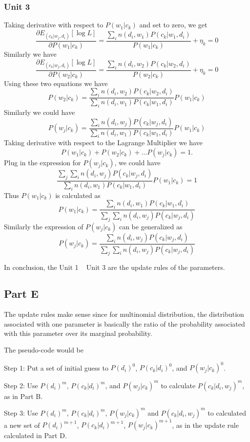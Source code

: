\subsubsection{Unit 3}
Taking derivative with respect to $P(w_1|c_k)$ and set to zero, we get
\[\dfrac{\partial E_{(c_k|w_j,d_i)}[\log{L}]}{\partial P(w_1|c_k)}=\dfrac{\sum\limits_{i}n(d_i,w_1)P(c_k|w_1,d_i)}{P(w_1|c_k)} +\eta_k=0\]
Similarly we have 
\[\dfrac{\partial E_{(c_k|w_j,d_i)}[\log{L}]}{\partial P(w_2|c_k)}=\dfrac{\sum\limits_{i}n(d_i,w_2)P(c_k|w_2,d_i)}{P(w_2|c_k)} +\eta_k=0\]
Using these two equations we have 
\[P(w_2|c_k)=\dfrac{\sum\limits_{i}n(d_i,w_2)P(c_k|w_2,d_i)}{\sum\limits_{i}n(d_i,w_1)P(c_k|w_1,d_i)}P(w_1|c_k)\]
Similarly we could have 
\[P(w_j|c_k)=\dfrac{\sum\limits_{i}n(d_i,w_j)P(c_k|w_j,d_i)}{\sum\limits_{i}n(d_i,w_1)P(c_k|w_1,d_i)}P(w_1|c_k)\]
Taking derivative with respect to the Lagrange Multiplier we have
\[P(w_1|c_k)+P(w_2|c_k)+\ldots P(w_j|c_k)=1.\]
Plug in the expression for $P(w_j|c_k)$, we could have
\[\dfrac{\sum\limits_{j}\sum\limits_{i}n(d_i,w_j)P(c_k|w_j,d_i)}{\sum\limits_{i}n(d_i,w_1)P(c_k|w_1,d_i)}P(w_1|c_k)=1\]
Thus $P(w_1|c_k)$ is calculated as 
\[P(w_1|c_k)=\dfrac{\sum\limits_{i}n(d_i,w_1)P(c_k|w_1,d_i)}{\sum\limits_{j}\sum\limits_{i}n(d_i,w_j)P(c_k|w_j,d_i)}\]
Similarly the expression of $P(w_j|c_k)$ can be generalized as 
\[P(w_j|c_k)=\dfrac{\sum\limits_{i}n(d_i,w_j)P(c_k|w_j,d_i)}{\sum\limits_{j}\sum\limits_{i}n(d_i,w_j)P(c_k|w_j,d_i)}\]

\noindent In conclusion, the Unit 1 ~ Unit 3 are the update rules of the parameters. 

\subsection{Part E}
The update rules make sense since for multinomial distribution, the distribution associated with one parameter is basically the ratio of the probability associated with this parameter over its marginal probability. 

\noindent The pseudo-code would be 

\noindent Step 1: Put a set of initial guess to ${P(d_i)}^0$, ${P(c_k|d_i)}^0$, and ${P(w_j|c_k)}^0$.

\noindent Step 2: Use ${P(d_i)}^m$, ${P(c_k|d_i)}^m$, and ${P(w_j|c_k)}^m$ to calculate ${P(c_k|d_i,w_j)}^m$, as in Part B. 

\noindent Step 3: Use  ${P(d_i)}^{m}$, ${P(c_k|d_i)}^{m}$, ${P(w_j|c_k)}^{m}$ and ${P(c_k|d_i,w_j)}^{m}$ to calculated a new set of ${P(d_i)}^{m+1}$, ${P(c_k|d_i)}^{m+1}$, ${P(w_j|c_k)}^{m+1}$, as in the update rule calculated in Part D. 

